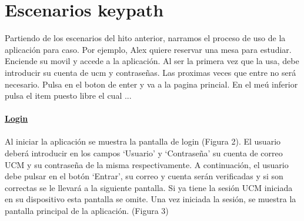 \documentclass[12pt]{article}
\begin{document}
\section{Escenarios keypath}

Partiendo de los escenarios del hito anterior, narramos el proceso de uso de la aplicación para caso. Por ejemplo, Alex quiere reservar una mesa para estudiar. Enciende su movil y accede a la aplicación. Al ser la primera vez que la usa, debe introducir su cuenta de ucm y contraseñas. Las proximas veces que entre no será necesario. Pulsa en el boton de enter y va a la pagina princial. En el meú inferior pulsa el item puesto libre el cual ... 
 \\
 \\
\textbf{\underline{Login}} \\
 \\
Al iniciar la aplicación se muestra la pantalla de login (Figura 2). El usuario deberá introducir en los campos ‘Usuario’ y ‘Contraseña’ su cuenta de correo UCM y su contraseña de la misma respectivamente. A continuación, el usuario debe pulsar en el botón ‘Entrar’, su correo y cuenta serán verificadas y si son correctas se le llevará a la siguiente pantalla. Si ya tiene la sesión UCM iniciada en su dispositivo esta pantalla se omite. Una vez iniciada la sesión, se muestra la pantalla principal de la aplicación. (Figura 3)\\
\end{document}
